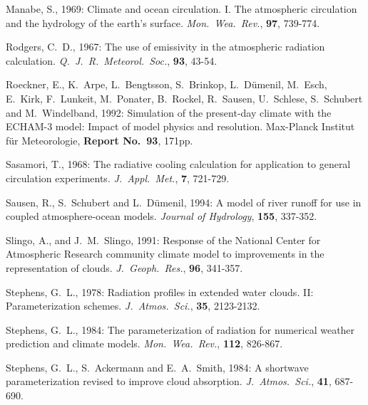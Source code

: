 Manabe, S., 1969: Climate and ocean circulation. I.
The atmospheric circulation and the
hydrology of the earth's surface. {\it
Mon.~Wea.~Rev.}, {\bf 97}, 739-774. 

Rodgers, C.~D., 1967: The use of emissivity in the
atmospheric radiation calculation.
{\it Q.~J.~R.~Meteorol.~Soc.}, {\bf 93}, 43-54. 

Roeckner, E., K.~Arpe, L.~Bengtsson, S.~Brinkop,
L.~D\"umenil, M.~Esch, E.~Kirk,
F.~Lunkeit, M.~Ponater, B.~Rockel, R.~Sausen,
U.~Schlese, S.~Schubert and
M.~Windelband,
1992: Simulation of the present-day climate with the
ECHAM-3 model: Impact of model
physics
and resolution. Max-Planck Institut f\"ur Meteorologie,
{\bf Report No.~93}, 171pp.

Sasamori, T., 1968: The radiative cooling calculation
for application to general circulation
experiments. {\it J.~Appl.~Met.}, {\bf 7}, 721-729.

Sausen, R., S.~Schubert and L.~D\"umenil, 1994: A
model of river runoff for use in coupled
atmosphere-ocean models. {\it Journal of Hydrology},
{\bf 155}, 337-352.

Slingo, A., and J.~M.~Slingo, 1991: Response of the National Center for Atmospheric Research
community climate model to improvements in the representation of clouds. {\it
J.~Geoph.~Res.}, {\bf 96}, 341-357.


Stephens, G.~L., 1978: Radiation profiles in extended water clouds. II: Parameterization
schemes. {\it J.~Atmos.~Sci.}, {\bf 35}, 2123-2132.

Stephens, G.~L., 1984: The parameterization of
radiation for numerical weather prediction
and
climate models. {\it Mon.~Wea.~Rev.}, {\bf 112},
826-867.

Stephens, G.~L., S.~Ackermann and E.~A.~Smith, 1984: A shortwave parameterization revised
to improve cloud absorption. {\it J.~Atmos.~Sci.}, {\bf 41}, 687-690.


